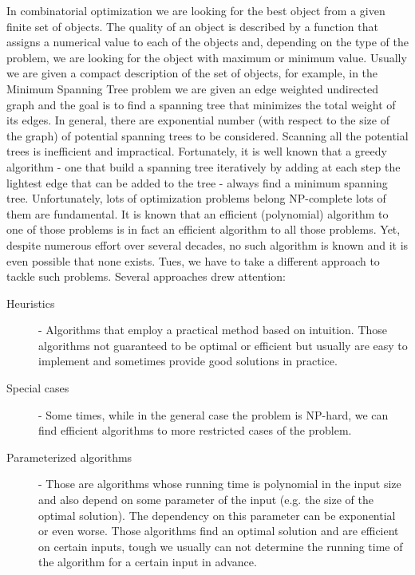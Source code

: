 In combinatorial optimization we are looking for the best object from a given finite set of
objects.
The quality of an object is described by a function
that assigns a numerical value to each of the objects and,
depending on the type of the problem,
we are looking for the object with maximum or minimum value.
Usually we are given a compact description of the set of objects,
for example, in the Minimum Spanning Tree problem we are given an
edge weighted undirected graph and the goal is to find a spanning tree that minimizes
the total weight of its edges.
In general, there are exponential number (with respect to the size of the graph)
of potential spanning trees to be considered.
Scanning all the potential trees is inefficient and impractical.
Fortunately, it is well known that a greedy algorithm -
one that build a spanning tree iteratively by adding at each step the lightest edge that can be added to the tree -
always find a minimum spanning tree.
Unfortunately, lots of optimization problems belong NP-complete lots of them are fundamental.
It is known that an efficient (polynomial) algorithm to one of those problems is in fact an efficient algorithm to all those problems.
Yet, despite numerous effort over several decades, no such algorithm is known and it is even possible that none exists.
Tues, we have to take a different approach to tackle such problems.
Several approaches drew attention:
\begin{description}
\item[Heuristics] - Algorithms that employ a practical method based on intuition.
Those algorithms not guaranteed to be optimal or efficient but usually are easy to implement and sometimes provide good solutions in practice.

\item[Special cases] - Some times, while in the general case the problem is NP-hard, we can find efficient algorithms to more restricted cases of the problem.

\item[Parameterized algorithms] - Those are algorithms whose running time is polynomial in the input size and also depend on some parameter of the input (e.g. the size of the optimal solution).
The dependency on this parameter can be exponential or even worse.
Those algorithms find an optimal solution and are efficient on certain inputs, tough we usually can not determine the running time of the algorithm for a certain input in advance.
\end{description}
